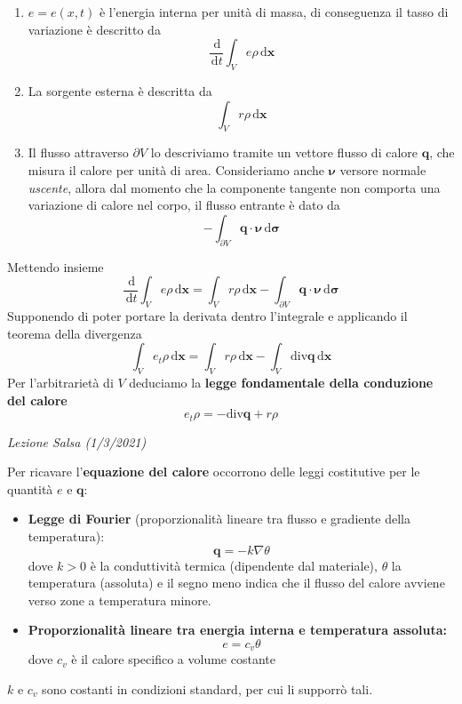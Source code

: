 \documentclass[10pt,a4paper,twoside,openright]{book}
\newcounter{conteggioS}
\newcommand{\LezioneS}[1]{
	\stepcounter{conteggioS}
	\textit{Lezione Salsa \arabic{conteggioS} (#1)}
	}
\newcommand{\x}{\mathbf{x}}
\newcommand{\sigg}{\bm{\sigma}}
\newcommand{\nuu}{\bm{\nu}}
\newcommand{\de}{\,\mathrm d}
\newcommand{\dt}{\de t}
\newcommand{\dxx}{\de \x}
\newcommand{\dsig}{\de \sigg}
\begin{document}
\begin{enumerate}
\item $e=e(x,t)$ è l'energia interna per unità di massa, di conseguenza il tasso di variazione è descritto da
\begin{equation*}
\frac{\de}{\dt}\int _{V} e\rho \dxx
\end{equation*}
\item La sorgente esterna è descritta da
\begin{equation*}
\int _{V} r\rho \dxx
\end{equation*}
\item Il flusso attraverso $\partial V$ lo descriviamo tramite un vettore flusso di calore $\mathbf{q}$, che misura il calore per unità di area. Consideriamo anche $\displaystyle \nuu$ versore normale \emph{uscente}, allora dal momento che la componente tangente non comporta una variazione di calore nel corpo, il flusso entrante è dato da
\begin{equation*}
-\int _{\partial V}\mathbf{q} \cdotp \nuu \dsig 
\end{equation*}
\end{enumerate}

Mettendo insieme
\begin{equation*}
\frac{\de}{\dt}\int _{V} e\rho \dxx=\int _{V} r\rho \dxx-\int _{\partial V}\mathbf{q} \cdotp \nuu \dsig 
\end{equation*}
Supponendo di poter portare la derivata dentro l'integrale e applicando il teorema della divergenza
\begin{equation*}
\int _{V} e_{t} \rho \dxx=\int _{V} r\rho \dxx-\int _{V}\mathrm{div}\mathbf{q} \dxx
\end{equation*}
Per l'arbitrarietà di $V$ deduciamo la \textbf{legge fondamentale della conduzione del calore}
\begin{equation*}
\boxed{e_{t} \rho =-\mathrm{div}\mathbf{q} +r\rho }
\end{equation*}


\LezioneS{1/3/2021}

Per ricavare l'\textbf{equazione del calore} occorrono delle leggi costitutive per le quantità $e$ e $\displaystyle \mathbf{q}$:
\begin{itemize}
\item \textbf{Legge di Fourier} (proporzionalità lineare tra flusso e gradiente della temperatura):
\begin{equation*}
\mathbf{q} =-k\nabla \theta 
\end{equation*}dove $k >0$ è la conduttività termica (dipendente dal materiale), $\displaystyle \theta $ la temperatura (assoluta) e il segno meno indica che il flusso del calore avviene verso zone a temperatura minore.
\item \textbf{Proporzionalità lineare tra energia interna e temperatura assoluta:}
\begin{equation*}
e=c_{v} \theta 
\end{equation*}
dove $\displaystyle c_{v}$ è il calore specifico a volume costante
\end{itemize}
$k$ e $\displaystyle c_{v}$ sono costanti in condizioni standard, per cui li supporrò tali.
\end{document}
